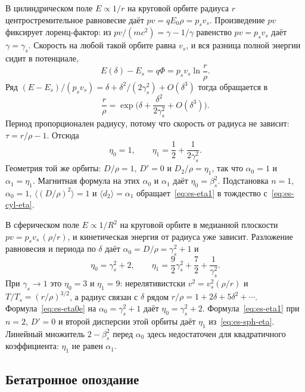 В цилиндрическом поле $E\propto 1/r$ на круговой орбите радиуса $r$ центростремительное равновесие даёт $pv=qE_0\rho=p_s v_s$. Произведение $pv$ фиксирует лоренц-фактор: из $pv/(mc^2)=\gamma-1/\gamma$ равенство $pv=p_s v_s$ даёт $\gamma=\gamma_s$. Скорость на любой такой орбите равна $v_s$, и вся разница полной энергии сидит в потенциале,
\begin{equation}
\label{eq:es-cyl-e}
E(\delta)-E_s=q\Phi=p_s v_s\ln\frac{r}{\rho}.
\end{equation}
Ряд $(E-E_s)/(p_s v_s)=\delta+\delta^2/(2\gamma_s^2)+O(\delta^3)$ тогда обращается в
\begin{equation}
\label{eq:es-cyl-r}
\frac{r}{\rho}=\exp\Biggl(\delta+\frac{\delta^2}{2\gamma_s^2}+O(\delta^3)\Biggr).
\end{equation}
Период пропорционален радиусу, потому что скорость от радиуса не зависит: $\tau=r/\rho-1$. Отсюда
\begin{equation}
\label{eq:es-cyl-eta}
\eta_0=1,
\qquad
\eta_1=\frac12+\frac{1}{2\gamma_s^2}.
\end{equation}
Геометрия той же орбиты: $D/\rho=1$, $D'=0$ и $D_2/\rho=\eta_1$, так что $\alpha_0=1$ и $\alpha_1=\eta_1$. Магнитная формула на этих $\alpha_0$ и $\alpha_1$ даёт $\eta_0=\beta_s^2$. Подстановка $n=1$, $\alpha_0=1$, $\langle(D/\rho)^2\rangle=1$ и $\langle d_2\rangle=\alpha_1$ обращает~\eqref{eq:es-eta1} в тождество с~\eqref{eq:es-cyl-eta}.

В сферическом поле $E\propto 1/R^2$ на круговой орбите в медианной плоскости $pv=p_s v_s\,(\rho/r)$, и кинетическая энергия от радиуса уже зависит. Разложение равновесия и периода по $\delta$ даёт $\alpha_0=D/\rho=\gamma_s^2+1$ и
\begin{equation}
\label{eq:es-sph-eta}
\eta_0=\gamma_s^2+2,
\qquad
\eta_1=\frac92\gamma_s^2+\frac72+\frac{1}{\gamma_s^2}.
\end{equation}
При $\gamma_s\to 1$ это $\eta_0=3$ и $\eta_1=9$: нерелятивистски $v^2=v_s^2(\rho/r)$ и $T/T_s=(r/\rho)^{3/2}$, а радиус связан с $\delta$ рядом $r/\rho=1+2\delta+5\delta^2+\cdots$. Формула~\eqref{eq:es-eta0e} на $\alpha_0=\gamma_s^2+1$ даёт $\eta_0=\gamma_s^2+2$. Формула~\eqref{eq:es-eta1} при $n=2$, $D'=0$ и второй дисперсии этой орбиты даёт $\eta_1$ из~\eqref{eq:es-sph-eta}. Линейный множитель $2-\beta_s^2$ перед $\alpha_0$ здесь недостаточен для квадратичного коэффициента: $\eta_1$ не равен $\alpha_1$.

\subsection{Бетатронное опоздание}
\label{sec:es-lambda}

